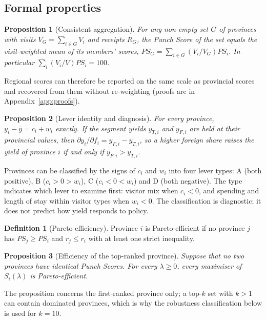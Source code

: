 \documentclass[11pt,a4paper]{article}
\newcommand{\PS}{\mathit{PS}}
\theoremstyle{plain}\newtheorem{proposition}{Proposition}
\theoremstyle{definition}\newtheorem{definition}{Definition}
\begin{document}
\subsection{Formal properties}
\begin{proposition}[Consistent aggregation]\label{prop:agg}
For any non-empty set $G$ of provinces with visits $V_G=\sum_{i\in G}V_i$ and receipts $R_G$, the Punch Score of the set equals the visit-weighted mean of its members' scores, $\PS_G=\sum_{i\in G}(V_i/V_G)\PS_i$. In particular $\sum_{i}(V_i/V)\PS_i=100$.
\end{proposition}
Regional scores can therefore be reported on the same scale as provincial scores and recovered from them without re-weighting (proofs are in Appendix~\ref{app:proofs}).

\begin{proposition}[Lever identity and diagnosis]\label{prop:lever}
For every province, $y_i-\bar y=c_i+w_i$ exactly. If the segment yields $y_{T,i}$ and $y_{F,i}$ are held at their provincial values, then $\partial y_i/\partial f_i=y_{F,i}-y_{T,i}$, so a higher foreign share raises the yield of province $i$ if and only if $y_{F,i}>y_{T,i}$.
\end{proposition}
Provinces can be classified by the signs of $c_i$ and $w_i$ into four lever types: A (both positive), B ($c_i>0>w_i$), C ($c_i<0<w_i$) and D (both negative). The type indicates which lever to examine first: visitor mix when $c_i<0$, and spending and length of stay within visitor types when $w_i<0$. The classification is diagnostic; it does not predict how yield responds to policy.

\begin{definition}[Pareto efficiency]
Province $i$ is Pareto-efficient if no province $j$ has $\PS_j\ge\PS_i$ and $r_j\le r_i$ with at least one strict inequality.
\end{definition}
\begin{proposition}[Efficiency of the top-ranked province]\label{prop:eff}
Suppose that no two provinces have identical Punch Scores. For every $\lambda\ge0$, every maximiser of $S_i(\lambda)$ is Pareto-efficient.
\end{proposition}
The proposition concerns the first-ranked province only; a top-$k$ set with $k>1$ can contain dominated provinces, which is why the robustness classification below is used for $k=10$.
\end{document}

